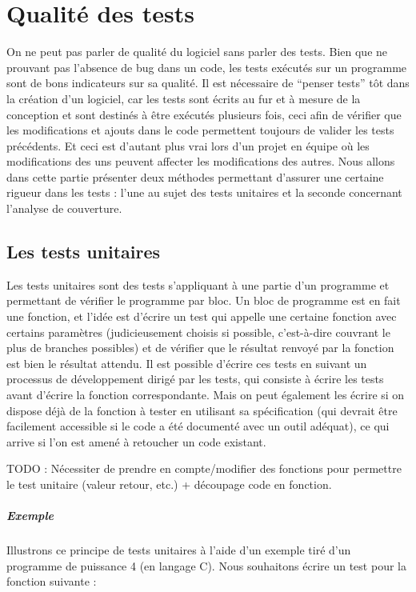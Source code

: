 \documentclass{report}
\begin{document}
\chapter{Qualité des tests}
On ne peut pas parler de qualité du logiciel sans parler des tests. Bien que ne prouvant pas l'absence de bug dans un code, les tests exécutés sur un programme sont de bons indicateurs sur sa qualité. Il est nécessaire de ``penser tests'' tôt dans la création d'un logiciel, car les tests sont écrits au fur et à mesure de la conception et sont destinés à être exécutés plusieurs fois, ceci afin de vérifier que les modifications et ajouts dans le code permettent toujours de valider les tests précédents. Et ceci est d'autant plus vrai lors d'un projet en équipe où les modifications des uns peuvent affecter les modifications des autres. Nous allons dans cette partie présenter deux méthodes permettant d'assurer une certaine rigueur dans les tests : l'une au sujet des tests unitaires et la seconde concernant l'analyse de couverture.
\section{Les tests unitaires}
Les tests unitaires sont des tests s'appliquant à une partie d'un programme et permettant de vérifier le programme par bloc. Un bloc de programme est en fait une fonction, et l'idée est d'écrire un test qui appelle une certaine fonction avec certains paramètres (judicieusement choisis si possible, c'est-à-dire couvrant le plus de branches possibles) et de vérifier que le résultat renvoyé par la fonction est bien le résultat attendu. Il est possible d'écrire ces tests en suivant un processus de développement dirigé par les tests, qui consiste à écrire les tests avant d'écrire la fonction correspondante. Mais on peut également les écrire si on dispose déjà de la fonction à tester en utilisant sa spécification (qui devrait être facilement accessible si le code a été documenté avec un outil adéquat), ce qui arrive si l'on est amené à retoucher un code existant.

TODO : Nécessiter de prendre en compte/modifier des fonctions pour permettre le test unitaire (valeur retour, etc.) + découpage code en fonction.
\paragraph{Exemple}
Illustrons ce principe de tests unitaires à l'aide d'un exemple tiré d'un programme de puissance 4 (en langage C). Nous souhaitons écrire un test pour la fonction suivante :
\end{document}
